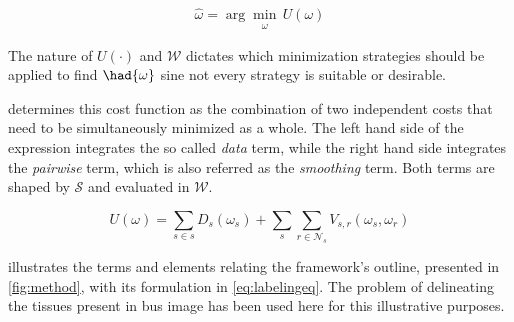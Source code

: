 \begin{equation}
\hat{\omega} = \arg \min_{\substack{\omega}} \,U(\omega)
\label{eq:costMin}
\end{equation}

The nature of $U(\cdot)$ and $\mathcal{W}$ dictates which minimization strategies should be applied to find $\had{\omega}$ sine not every strategy is suitable or desirable.

 determines this cost function as the combination of two independent costs that need to be simultaneously minimized as a whole.
The left hand side of the expression integrates the so called \emph{data} term, while the right hand side integrates the \emph{pairwise} term, which is also referred as the \emph{smoothing} term.
Both terms are shaped by $\mathcal{S}$ and evaluated in $\mathcal{W}$.

\begin{equation}
  U(\omega) = \sum_{s\in s} D_s(\omega_s) + \sum_{s}\sum_{r \in \mathcal{N}_{s}} V_{s,r}(\omega_s,\omega_r)
  \label{eq:labelingeq}
\end{equation}

 illustrates the terms and elements relating the framework's outline, presented in \cref{fig:method}, with its formulation in \cref{eq:labelingeq}.
The problem of delineating the tissues present in \ac{bus} image has been used here for this illustrative purposes. 

